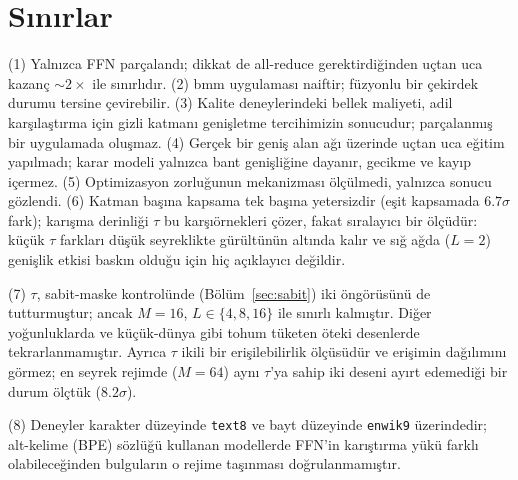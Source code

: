\documentclass[10pt,journal]{IEEEtran}
\begin{document}
\section{Sınırlar}
\label{sec:sinir}
(1) Yalnızca FFN parçalandı; dikkat de all-reduce gerektirdiğinden uçtan uca kazanç
$\sim\!2\times$ ile sınırlıdır. (2) bmm uygulaması naiftir; füzyonlu bir çekirdek durumu
tersine çevirebilir. (3) Kalite deneylerindeki bellek maliyeti, adil karşılaştırma için gizli
katmanı genişletme tercihimizin sonucudur; parçalanmış bir uygulamada oluşmaz. (4) Gerçek bir
geniş alan ağı üzerinde uçtan uca eğitim yapılmadı; karar modeli yalnızca bant genişliğine
dayanır, gecikme ve kayıp içermez. (5) Optimizasyon zorluğunun mekanizması ölçülmedi,
yalnızca sonucu gözlendi. (6) Katman başına kapsama tek başına yetersizdir (eşit kapsamada
$6.7\sigma$ fark); karışma derinliği $\tau$ bu karşıörnekleri çözer, fakat sıralayıcı bir
ölçüdür: küçük $\tau$ farkları düşük seyreklikte gürültünün altında kalır ve sığ ağda
($L{=}2$) genişlik etkisi baskın olduğu için hiç açıklayıcı değildir.

(7) $\tau$, sabit-maske kontrolünde (Bölüm~\ref{sec:sabit}) iki öngörüsünü de tutturmuştur;
ancak $M{=}16$, $L\in\{4,8,16\}$ ile sınırlı kalmıştır. Diğer yoğunluklarda ve küçük-dünya
gibi tohum tüketen öteki desenlerde tekrarlanmamıştır. Ayrıca $\tau$ ikili bir erişilebilirlik
ölçüsüdür ve erişimin dağılımını görmez; en seyrek rejimde ($M{=}64$) aynı $\tau$'ya sahip iki
deseni ayırt edemediği bir durum ölçtük ($8.2\sigma$).

(8) Deneyler karakter düzeyinde \texttt{text8} ve bayt düzeyinde \texttt{enwik9} üzerindedir;
alt-kelime (BPE) sözlüğü kullanan modellerde FFN'in karıştırma yükü farklı olabileceğinden
bulguların o rejime taşınması doğrulanmamıştır.

\end{document}
